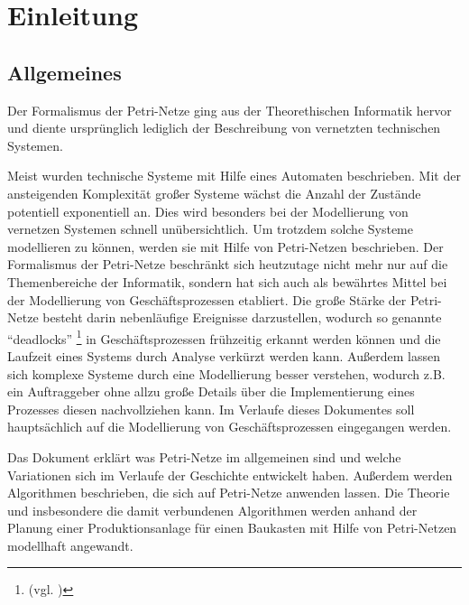 
\chapter{Einleitung}
\section{Allgemeines}
Der Formalismus der Petri-Netze ging aus der Theorethischen Informatik hervor
und diente ursprünglich lediglich der Beschreibung von vernetzten technischen Systemen.

Meist wurden technische Systeme mit Hilfe eines Automaten beschrieben.
Mit der ansteigenden Komplexität großer Systeme wächst die Anzahl der Zustände potentiell exponentiell an.
Dies wird besonders bei der Modellierung von vernetzen Systemen schnell unübersichtlich.
Um trotzdem solche Systeme modellieren zu können, werden sie mit Hilfe von Petri-Netzen beschrieben.
Der Formalismus der Petri-Netze beschränkt sich heutzutage nicht mehr nur auf die Themenbereiche der Informatik,
sondern hat sich auch als bewährtes Mittel bei der Modellierung von Geschäftsprozessen etabliert.
Die große Stärke der Petri-Netze besteht darin nebenläufige Ereignisse darzustellen,
wodurch so genannte \enquote{deadlocks} \footnote{(vgl. \cite{microsoft:deadlocks})}
in Geschäftsprozessen frühzeitig erkannt werden können und
die Laufzeit eines Systems durch Analyse verkürzt werden kann.
Außerdem lassen sich komplexe Systeme durch eine Modellierung besser verstehen,
wodurch z.B. ein Auftraggeber ohne allzu große Details über die Implementierung eines Prozesses
diesen nachvollziehen kann.
Im Verlaufe dieses Dokumentes soll hauptsächlich auf die Modellierung von Geschäftsprozessen eingegangen werden.

Das Dokument erklärt was Petri-Netze im allgemeinen sind und
welche Variationen sich im Verlaufe der Geschichte entwickelt haben.
Außerdem werden Algorithmen beschrieben, die sich auf Petri-Netze anwenden lassen.
Die Theorie und insbesondere die damit verbundenen Algorithmen
werden anhand der Planung einer Produktionsanlage für einen Baukasten
mit Hilfe von Petri-Netzen modellhaft angewandt.
\newpage

